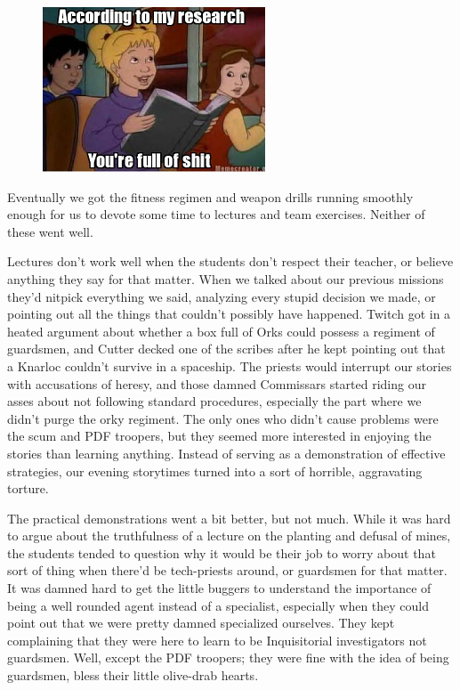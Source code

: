 \begin{figure}
	\begin{center}
		\includegraphics[width=\figwidth]{pics/8/15.png}
	\end{center}
\end{figure}
Eventually we got the fitness regimen and weapon drills running smoothly enough for us to devote some time to lectures and team exercises. 
Neither of these went well.

Lectures don’t work well when the students don’t respect their teacher, or believe anything they say for that matter. 
When we talked about our previous missions they’d nitpick everything we said, analyzing every stupid decision we made, or pointing out all the things that couldn’t possibly have happened. 
Twitch got in a heated argument about whether a box full of Orks could possess a regiment of guardsmen, and Cutter decked one of the scribes after he kept pointing out that a Knarloc couldn’t survive in a spaceship. 
The priests would interrupt our stories with accusations of heresy, and those damned Commissars started riding our asses about not following standard procedures, especially the part where we didn’t purge the orky regiment. 
The only ones who didn’t cause problems were the scum and PDF troopers, but they seemed more interested in enjoying the stories than learning anything. 
Instead of serving as a demonstration of effective strategies, our evening storytimes turned into a sort of horrible, aggravating torture. 


The practical demonstrations went a bit better, but not much. 
While it was hard to argue about the truthfulness of a lecture on the planting and defusal of mines, the students tended to question why it would be their job to worry about that sort of thing when there’d be tech-priests around, or guardsmen for that matter. 
It was damned hard to get the little buggers to understand the importance of being a well rounded agent instead of a specialist, especially when they could point out that we were pretty damned specialized ourselves. 
They kept complaining that they were here to learn to be Inquisitorial investigators not guardsmen. 
Well, except the PDF troopers; 
they were fine with the idea of being guardsmen, bless their little olive-drab hearts.

